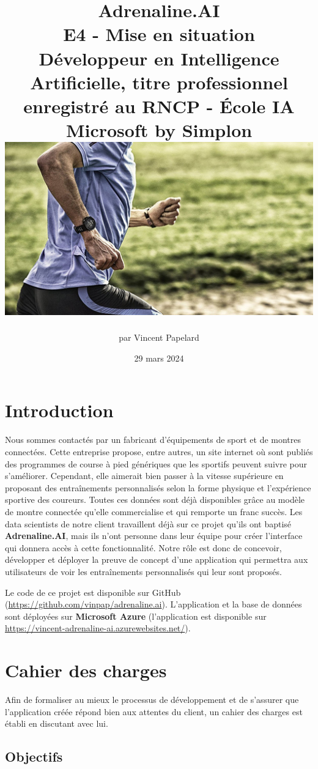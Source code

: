 \documentclass[french]{article}
\title{%
    \huge Adrenaline.AI  \\
    \bigskip
    \large E4 - Mise en situation \\ 
    Développeur en Intelligence Artificielle,
    titre professionnel enregistré au RNCP - École IA Microsoft by Simplon
    \vfill
    \includegraphics[width=14cm]{running.jpeg}
    \vfill}
\date{29 mars 2024}
\author{par Vincent Papelard}
\begin{document}
    \renewcommand{\contentsname}{Table des Matières}
    \renewcommand{\refname}{Références}
    \maketitle
    \newpage
    \tableofcontents
    \newpage

    \section*{Introduction}

    Nous sommes contactés par un fabricant d'équipements de sport et de montres connectées. Cette entreprise propose, entre autres, un site internet où sont publiés des programmes de course à pied génériques que les sportifs peuvent suivre pour s'améliorer. Cependant, elle aimerait bien passer à la vitesse supérieure en proposant des entraînements personnalisés selon la forme physique et l'expérience sportive des coureurs. Toutes ces données sont déjà disponibles grâce au modèle de montre connectée qu'elle commercialise et qui remporte un franc succès. Les data scientists de notre client travaillent déjà sur ce projet qu'ils ont baptisé \textbf{Adrenaline.AI}, mais ils n'ont personne dans leur équipe pour créer l'interface qui donnera accès à cette fonctionnalité. Notre rôle est donc de concevoir, développer et déployer la preuve de concept d'une application qui permettra aux utilisateurs de voir les entraînements personnalisés qui leur sont proposés.
    
    Le code de ce projet est disponible sur GitHub (\href{https://github.com/vinpap/adrenaline.ai}{https://github.com/vinpap/adrenaline.ai}). L'application et la base de données sont déployées sur \textbf{Microsoft Azure} (l'application est disponible sur \href{https://vincent-adrenaline-ai.azurewebsites.net/}{https://vincent-adrenaline-ai.azurewebsites.net/}).
    \section{Cahier des charges}

    Afin de formaliser au mieux le processus de développement et de s'assurer que l'application créée répond bien aux attentes du client, un cahier des charges est établi en discutant avec lui.

    \subsection{Objectifs}
\end{document}
